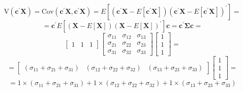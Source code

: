 \begin{enumerate}[label=(\alph*)]
            \[
                \text{V}\left(\textbf{c}^\prime\textbf{X}\right)
                =
                \text{Cov}\left(\textbf{c}^\prime\textbf{X},\textbf{c}^\prime\textbf{X}\right)
                =
                E\left[\left(\textbf{c}^\prime\textbf{X} - E\left[\textbf{c}^\prime\textbf{X}\right]\right)\left(\textbf{c}^\prime\textbf{X} - E\left[\textbf{c}^\prime\textbf{X}\right]\right)^\prime\right]
                =
            \]
            \[
                =
                \textbf{c}^\prime E\left[\left(\textbf{X} - E\left[\textbf{X}\right]\right){\left(\textbf{X} - E\left[\textbf{X}\right]\right)}^\prime\right]\textbf{c}
                =
                \textbf{c}^\prime\mathbf{\Sigma}\textbf{c}
                =
            \]
            \[
                \begin{bmatrix}
                    1 & 1 & 1
                \end{bmatrix}
                \begin{bmatrix}
                    \sigma_{11} & \sigma_{12} & \sigma_{13} \\
                    \sigma_{21} & \sigma_{22} & \sigma_{23} \\
                    \sigma_{31} & \sigma_{32} & \sigma_{33}
                \end{bmatrix}
                \begin{bmatrix}
                    1 \\
                    1 \\
                    1
                \end{bmatrix}
                =
            \]
            \[
                =
                \begin{bmatrix}
                    \left(\sigma_{11} + \sigma_{21} + \sigma_{31}\right) &
                    \left(\sigma_{12} + \sigma_{22} + \sigma_{32}\right) &
                    \left(\sigma_{13} + \sigma_{23} + \sigma_{33}\right)
                \end{bmatrix}
                \begin{bmatrix}
                    1 \\
                    1 \\
                    1
                \end{bmatrix}
                =
            \]
            \[
                =
                1 \times \left(\sigma_{11} + \sigma_{21} + \sigma_{31}\right) + 1 \times \left(\sigma_{12} + \sigma_{22} + \sigma_{32}\right)
                    + 1 \times \left(\sigma_{13} + \sigma_{23} + \sigma_{33}\right)
\]
\end{enumerate}
